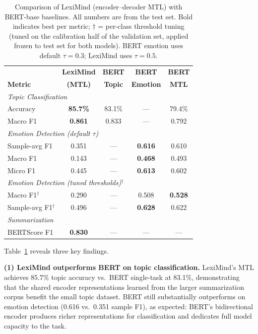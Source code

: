 \documentclass[11pt]{article}
\begin{document}
\begin{table}[t]
\centering
\caption{Comparison of LexiMind (encoder--decoder MTL) with BERT-base baselines. All numbers are from the test set. Bold indicates best per metric; $\dagger$ = per-class threshold tuning (tuned on the calibration half of the validation set, applied frozen to test set for both models). BERT emotion uses default $\tau=0.3$; LexiMind uses $\tau=0.5$.}
\label{tab:bert_comparison}
\footnotesize
\setlength{\tabcolsep}{3pt}
\begin{tabular}{lcccc}
\toprule
 & \textbf{LexiMind} & \textbf{BERT} & \textbf{BERT} & \textbf{BERT} \\
\textbf{Metric} & \textbf{(MTL)} & \textbf{Topic} & \textbf{Emotion} & \textbf{MTL} \\
\midrule
\multicolumn{5}{l}{\textit{Topic Classification}} \\
\quad Accuracy & \textbf{85.7\%} & 83.1\% & --- & 79.4\% \\
\quad Macro F1 & \textbf{0.861} & 0.833 & --- & 0.792 \\
\midrule
\multicolumn{5}{l}{\textit{Emotion Detection (default $\tau$)}} \\
\quad Sample-avg F1 & 0.351 & --- & \textbf{0.616} & 0.610 \\
\quad Macro F1 & 0.143 & --- & \textbf{0.468} & 0.493 \\
\quad Micro F1 & 0.445 & --- & \textbf{0.613} & 0.602 \\
\midrule
\multicolumn{5}{l}{\textit{Emotion Detection (tuned thresholds)$^\dagger$}} \\
\quad Macro F1$^\dagger$ & 0.290 & --- & 0.508 & \textbf{0.528} \\
\quad Sample-avg F1$^\dagger$ & 0.496 & --- & \textbf{0.628} & 0.622 \\
\midrule
\multicolumn{5}{l}{\textit{Summarization}} \\
\quad BERTScore F1 & \textbf{0.830} & --- & --- & --- \\
\bottomrule
\end{tabular}
\end{table}

Table~\ref{tab:bert_comparison} reveals three key findings.

\textbf{(1) LexiMind outperforms BERT on topic classification.} LexiMind's MTL achieves 85.7\% topic accuracy vs.\ BERT single-task at 83.1\%, demonstrating that the shared encoder representations learned from the larger summarization corpus benefit the small topic dataset. BERT still substantially outperforms on emotion detection (0.616 vs.\ 0.351 sample F1), as expected: BERT's bidirectional encoder produces richer representations for classification and dedicates full model capacity to the task.
\end{document}
